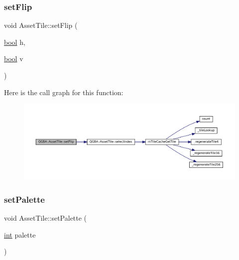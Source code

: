 \mbox{\label{class_q_g_b_a_1_1_asset_tile_ae4996f927c74eeb6759eb0f3b77acd0d}} 
\subsubsection{\texorpdfstring{set\+Flip}{setFlip}}
{\footnotesize\ttfamily void Asset\+Tile\+::set\+Flip (\begin{DoxyParamCaption}\item[{\mbox{\hyperlink{libretro_8h_a4a26dcae73fb7e1528214a068aca317e}{bool}}}]{h,  }\item[{\mbox{\hyperlink{libretro_8h_a4a26dcae73fb7e1528214a068aca317e}{bool}}}]{v }\end{DoxyParamCaption})\hspace{0.3cm}{\ttfamily [slot]}}

Here is the call graph for this function\+:
\nopagebreak
\begin{figure}[H]
\begin{center}
\leavevmode
\includegraphics[width=350pt]{class_q_g_b_a_1_1_asset_tile_ae4996f927c74eeb6759eb0f3b77acd0d_cgraph}
\end{center}
\end{figure}
\mbox{\label{class_q_g_b_a_1_1_asset_tile_ae6edb2008ce1ff20223ae29193765a72}} 
\subsubsection{\texorpdfstring{set\+Palette}{setPalette}}
{\footnotesize\ttfamily void Asset\+Tile\+::set\+Palette (\begin{DoxyParamCaption}\item[{\mbox{\hyperlink{ioapi_8h_a787fa3cf048117ba7123753c1e74fcd6}{int}}}]{palette }\end{DoxyParamCaption})\hspace{0.3cm}{\ttfamily [slot]}}

